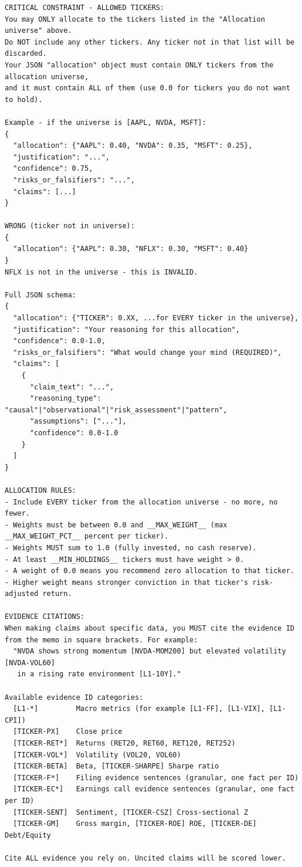 \documentclass{article}
\begin{document}
\begin{lstlisting}
CRITICAL CONSTRAINT - ALLOWED TICKERS:
You may ONLY allocate to the tickers listed in the "Allocation universe" above.
Do NOT include any other tickers. Any ticker not in that list will be discarded.
Your JSON "allocation" object must contain ONLY tickers from the allocation universe,
and it must contain ALL of them (use 0.0 for tickers you do not want to hold).

Example - if the universe is [AAPL, NVDA, MSFT]:
{
  "allocation": {"AAPL": 0.40, "NVDA": 0.35, "MSFT": 0.25},
  "justification": "...",
  "confidence": 0.75,
  "risks_or_falsifiers": "...",
  "claims": [...]
}

WRONG (ticker not in universe):
{
  "allocation": {"AAPL": 0.30, "NFLX": 0.30, "MSFT": 0.40}
}
NFLX is not in the universe - this is INVALID.

Full JSON schema:
{
  "allocation": {"TICKER": 0.XX, ...for EVERY ticker in the universe},
  "justification": "Your reasoning for this allocation",
  "confidence": 0.0-1.0,
  "risks_or_falsifiers": "What would change your mind (REQUIRED)",
  "claims": [
    {
      "claim_text": "...",
      "reasoning_type": "causal"|"observational"|"risk_assessment"|"pattern",
      "assumptions": ["..."],
      "confidence": 0.0-1.0
    }
  ]
}

ALLOCATION RULES:
- Include EVERY ticker from the allocation universe - no more, no fewer.
- Weights must be between 0.0 and __MAX_WEIGHT__ (max __MAX_WEIGHT_PCT__ percent per ticker).
- Weights MUST sum to 1.0 (fully invested, no cash reserve).
- At least __MIN_HOLDINGS__ tickers must have weight > 0.
- A weight of 0.0 means you recommend zero allocation to that ticker.
- Higher weight means stronger conviction in that ticker's risk-adjusted return.

EVIDENCE CITATIONS:
When making claims about specific data, you MUST cite the evidence ID
from the memo in square brackets. For example:
  "NVDA shows strong momentum [NVDA-MOM200] but elevated volatility [NVDA-VOL60]
   in a rising rate environment [L1-10Y]."

Available evidence ID categories:
  [L1-*]         Macro metrics (for example [L1-FF], [L1-VIX], [L1-CPI])
  [TICKER-PX]    Close price
  [TICKER-RET*]  Returns (RET20, RET60, RET120, RET252)
  [TICKER-VOL*]  Volatility (VOL20, VOL60)
  [TICKER-BETA]  Beta, [TICKER-SHARPE] Sharpe ratio
  [TICKER-F*]    Filing evidence sentences (granular, one fact per ID)
  [TICKER-EC*]   Earnings call evidence sentences (granular, one fact per ID)
  [TICKER-SENT]  Sentiment, [TICKER-CSZ] Cross-sectional Z
  [TICKER-GM]    Gross margin, [TICKER-ROE] ROE, [TICKER-DE] Debt/Equity

Cite ALL evidence you rely on. Uncited claims will be scored lower.
\end{lstlisting}
\end{document}

